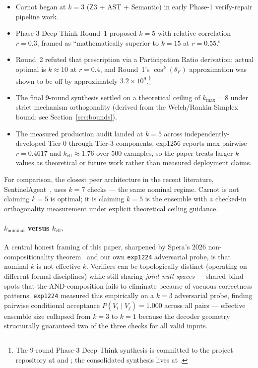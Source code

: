 \documentclass[10pt]{article}
\begin{document}
\begin{itemize}
  \item Carnot began at $k=3$ (Z3 + AST + Semantic) in early
        Phase-1 verify-repair pipeline work.
  \item Phase-3 Deep Think Round~1 proposed $k=5$ with relative
        correlation $r=0.3$, framed as ``mathematically superior to
        $k=15$ at $r=0.55$.''
  \item Round~2 refuted that prescription via a Participation Ratio
        derivation: actual optimal is $k \approx 10$ at $r=0.4$, and
        Round~1's $\cos^k(\theta_F)$ approximation was shown to be
        off by approximately $3.2 \times 10^9$.\footnote{The 9-round
        Phase-3 Deep Think synthesis is committed to the project
        repository at
        and ;
        the consolidated synthesis lives at
        .}
  \item The final 9-round synthesis settled on a theoretical ceiling
        of $k_{\max}=8$ under strict mechanism orthogonality (derived
        from the Welch/Rankin Simplex bound; see
        Section~\ref{sec:bounds}).
  \item The measured production audit landed at $k=5$ across
        independently-developed Tier-0 through Tier-3 components.
        exp1256 reports max pairwise $r=0.4617$ and
        $k_{\text{eff}} \approx 1.76$ over 500 examples, so the
        paper treats larger $k$ values as theoretical or future
        work rather than measured deployment claims.
\end{itemize}

For comparison, the closest peer architecture in the recent
literature, SentinelAgent~\cite{patil2026sentinelagent}, uses $k=7$
checks --- the same nominal regime. Carnot is not claiming $k=5$ is
optimal; it is claiming $k=5$ is the ensemble with a checked-in
orthogonality measurement under explicit theoretical ceiling guidance.

\paragraph{$k_{\text{nominal}}$ versus $k_{\text{eff}}$.}
A central honest framing of this paper, sharpened by Spera's
2026 non-compositionality theorem~\cite{spera2026noncomposability}
and our own \texttt{exp1224} adversarial probe, is that nominal $k$
is not effective $k$. Verifiers can be topologically distinct
(operating on different formal disciplines) while still sharing
\emph{joint null spaces} --- shared blind spots that the
AND-composition fails to eliminate because of vacuous correctness
patterns. \texttt{exp1224} measured this empirically on a $k=3$
adversarial probe, finding pairwise conditional acceptance
$P(V_i \mid V_j) = 1.000$ across all pairs --- effective ensemble
size collapsed from $k=3$ to $k=1$ because the decoder geometry
structurally guaranteed two of the three checks for all valid
inputs.
\end{document}
